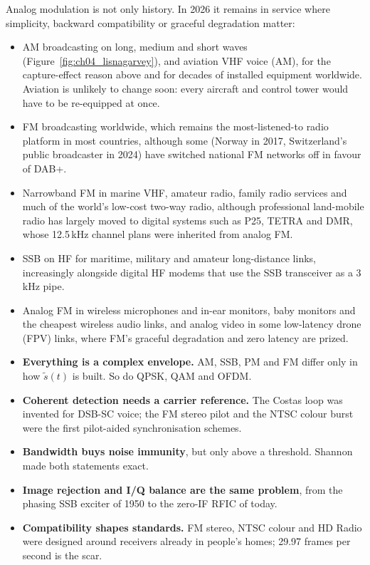 Analog modulation is not only history. In 2026 it remains in service where simplicity, backward compatibility
or graceful degradation matter:
\begin{itemize}
\item AM broadcasting on long, medium and short waves (Figure~\ref{fig:ch04_lisnagarvey}), and aviation VHF
voice (AM), for the capture-effect
reason above and for decades of installed equipment worldwide. Aviation is unlikely to change soon: every
aircraft and control tower would have to be re-equipped at once.
\item FM broadcasting worldwide, which remains the most-listened-to radio platform in most countries, although
some (Norway in 2017, Switzerland's public broadcaster in 2024) have switched national FM networks off in
favour of DAB+.
\item Narrowband FM in marine VHF, amateur radio, family radio services and much of the world's low-cost
two-way radio, although professional land-mobile radio has largely moved to digital systems such as P25, TETRA
and DMR, whose 12.5\,kHz channel plans were inherited from analog FM.
\item SSB on HF for maritime, military and amateur long-distance links, increasingly alongside digital HF
modems that use the SSB transceiver as a 3\,kHz pipe.
\item Analog FM in wireless microphones and in-ear monitors, baby monitors and the cheapest wireless audio
links, and analog video in some low-latency drone (FPV) links, where FM's graceful degradation and zero
latency are prized.
\end{itemize}


\begin{keyidea}
\begin{itemize}
\item \textbf{Everything is a complex envelope.} AM, SSB, PM and FM differ only in how $\tilde{s}(t)$ is
built. So do QPSK, QAM and OFDM.
\item \textbf{Coherent detection needs a carrier reference.} The Costas loop was invented for DSB-SC voice;
the FM stereo pilot and the NTSC colour burst were the first pilot-aided synchronisation schemes.
\item \textbf{Bandwidth buys noise immunity}, but only above a threshold. Shannon made both statements exact.
\item \textbf{Image rejection and I/Q balance are the same problem}, from the phasing SSB exciter of 1950 to
the zero-IF RFIC of today.
\item \textbf{Compatibility shapes standards.} FM stereo, NTSC colour and HD Radio were designed around
receivers already in people's homes; 29.97 frames per second is the scar.
\end{itemize}
\end{keyidea}

